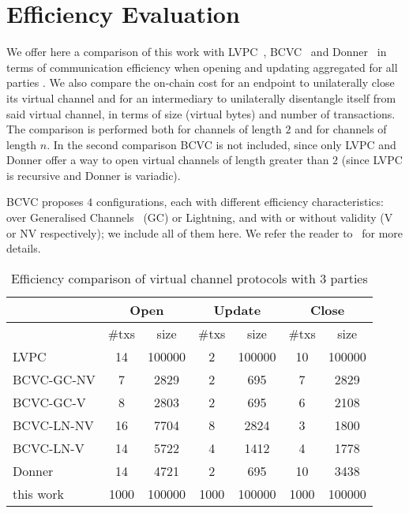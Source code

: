 \section{Efficiency Evaluation}
  \label{section:comparison}
  We offer here a comparison of this work with
  LVPC~\cite{10.1007/978-3-030-65411-5_18}, BCVC~\cite{cryptoeprint:2020:554}
  and Donner~\cite{donner} in terms of communication efficiency when opening and
  updating aggregated for all parties . We also compare
  the on-chain cost for an endpoint to unilaterally close its virtual channel
  and for an intermediary to unilaterally disentangle itself from said virtual
  channel, in terms of size (virtual bytes) and number of transactions. The
  comparison is performed both for channels of length $2$ and for channels of
  length $n$. In the second comparison BCVC is not included, since only LVPC and
  Donner offer a way to open virtual channels of length greater than $2$ (since
  LVPC is recursive and Donner is variadic).

  BCVC proposes $4$ configurations, each with different efficiency
  characteristics: over Generalised Channels~\cite{cryptoeprint:2020:476} (GC)
  or Lightning, and with or without validity (V or NV respectively); we include
  all of them here. We refer the reader to~\cite{cryptoeprint:2020:554} for more
  details.

  \begin{table*}
    \caption{Efficiency comparison of virtual channel protocols with $3$
    parties}
    \label{table:comparison:overhead:3-parties}
    \begin{minipage}{\textwidth}
    \begin{center}
    \begin{tabular}{|l|c|c|c|c|c|c|}
    \hline
              & \multicolumn{2}{|c|}{Open} & \multicolumn{2}{|c|}{Update} &
              \multicolumn{2}{|c|}{Close} \\
    \hline
              & \#txs & size & \#txs & size & \#txs & size \\
    \hline
    LVPC       & 14 & 100000 & 2 & 100000 & 10 & 100000 \\
    \hline
    BCVC-GC-NV
              & 7 & 2829 & 2 & 695 & 7 & 2829 \\
    \hline
    BCVC-GC-V & 8 & 2803 & 2 & 695 & 6 & 2108 \\
    \hline
    BCVC-LN-NV
              & 16 & 7704 & 8 & 2824 & 3 & 1800 \\
    \hline
    BCVC-LN-V & 14 & 5722 & 4 & 1412 & 4 & 1778 \\
    \hline
    Donner    & 14 & 4721 & 2 & 695 & 10 & 3438 \\
    \hline
    this work & 1000 & 100000 & 1000 & 100000 & 1000 & 100000 \\
    \hline
    \end{tabular}
    \end{center}
    \end{minipage}
  \end{table*}

